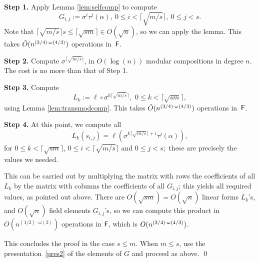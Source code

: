 \smallskip\noindent\textbf{Step 1.} Apply Lemma \ref{lem:selfcomp} to compute
$$G_{i,j} := \sigma^i\tau^j(\alpha),\ 0\leq i < \lceil \sqrt{m/s}
\rceil,\ 0 \leq j < s.$$ Note that
$\lceil \sqrt{m/s} \rceil s \leq \lceil \sqrt{sm} \rceil \in O(\sqrt n)$,
so we can apply the lemma. This takes $\tilde{O}(n^{(3/4)\cdot \omega(4/3)})$
operations in~${\mathsf{F}}$.

\smallskip\noindent\textbf{Step 2.} Compute
$\sigma^{\lceil \sqrt{m/s} \rceil}$, in $O(\log(n))$ modular compositions
in degree $n$. The cost is no more than that of Step 1.

\smallskip\noindent\textbf{Step 3.} Compute
\smallskipback
\[
  L_k := \ell \circ \sigma^{k\lceil \sqrt{m/s} \rceil}, \,\, 0\leq k <
  \lceil \sqrt{sm}\rceil,
\]
using Lemma \ref{lem:transmodcomp}.  This takes $\tilde{O}(n^{(3/4)\cdot \omega(4/3)})$ operations
in~${\mathsf{F}}$.

\smallskip\noindent\textbf{Step 4.} At this point, we compute all
$$ L_k(s_{i,j}) = \ell(\sigma^{k\lceil \sqrt{m/s} \rceil + i}\tau
^j(\alpha)),$$ for $0\le k < \lceil \sqrt{sm}\rceil$,
$0\le i< \lceil \sqrt{m/s}\rceil$ and $0 \leq j < s;$ these are precisely
the values we needed.

This can be carried out by multiplying the matrix with rows the
coefficients of all $L_k$ by the matrix with columns the coefficients of
all $G_{i,j}$; this yields all required values, as pointed out above. There
are $O(\sqrt{sm})=O(\sqrt{n})$ linear forms $L_k$'s, and $O(\sqrt{n})$
field elements $G_{i,j}$'s, so we can compute this product in
$O(n^{(1/2)\cdot\omega(2)})$ operations in ${\mathsf{F}}$, which is $O(n^{(3/4)\cdot \omega(4/3)})$.

This concludes the proof in the case $s \le m$. When $m \le s$, use the
presentation~\eqref{pres2} of the elements of $G$ and proceed as above.
\qed

